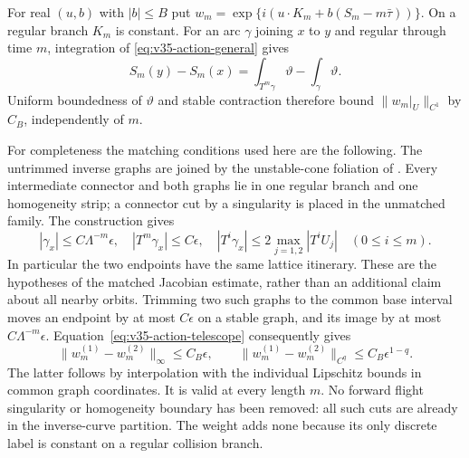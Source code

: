 For real $(u,b)$ with $|b|\le B$ put
$w_m=\exp\{i(u\cdot K_m+b(S_m-m\bar\tau))\}$.
On a regular branch $K_m$ is constant. For an arc $\gamma$ joining
$x$ to $y$ and regular through time $m$, integration of
\eqref{eq:v35-action-general} gives
\begin{equation}\label{eq:v35-action-telescope}
 S_m(y)-S_m(x)=\int_{T^m\gamma}\vartheta-\int_\gamma\vartheta.
\end{equation}
Uniform boundedness of $\vartheta$ and stable contraction therefore
bound $\|w_m|_U\|_{C^1}$ by $C_B$, independently of $m$.

For completeness the matching conditions used here are the following.
The untrimmed inverse graphs are joined by the unstable-cone foliation
of \cite[Lemma 3.3 and Section 4.3]{DZ}. Every intermediate connector
and both graphs lie in one regular branch and one homogeneity strip;
a connector cut by a singularity is placed in the unmatched family.
The construction gives
\[
 |\gamma_x|\le C\Lambda^{-m}\epsilon,\quad
 |T^m\gamma_x|\le C\epsilon,\quad
 |T^i\gamma_x|\le2\max_{j=1,2}|T^iU_j|\quad(0\le i\le m).
\]
In particular the two endpoints have the same lattice itinerary. These
are the hypotheses of the matched Jacobian estimate, rather than an
additional claim about all nearby orbits. Trimming two such graphs to
the common base interval moves an endpoint by at most $C\epsilon$
on a stable graph, and its image by at most $C\Lambda^{-m}\epsilon$.
Equation~\eqref{eq:v35-action-telescope} consequently gives
\begin{equation}\label{eq:v35-weight-match-detail}
 \|w_m^{(1)}-w_m^{(2)}\|_\infty\le C_B\epsilon,
 \qquad
 \|w_m^{(1)}-w_m^{(2)}\|_{C^q}\le C_B\epsilon^{1-q}.
\end{equation}
The latter follows by interpolation with the individual Lipschitz
bounds in common graph coordinates. It is valid at every length $m$.
No forward flight singularity or homogeneity boundary has been removed:
all such cuts are already in the inverse-curve partition. The weight
adds none because its only discrete label is constant on a regular
collision branch.

